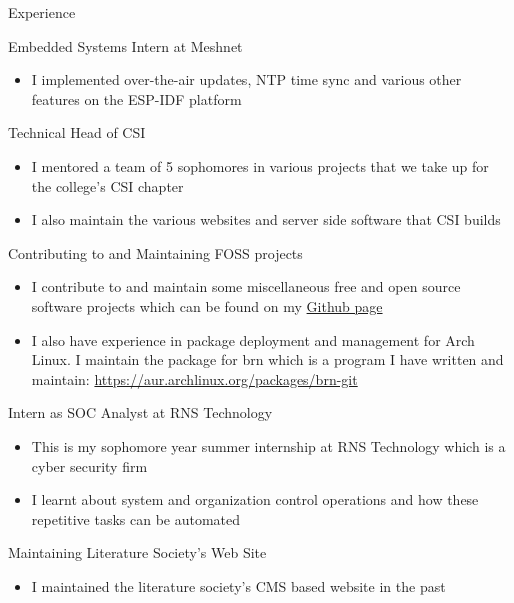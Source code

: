 \documentclass{article}
\newlength{\tabin}
\newlength{\secsep}
\newcommand{\lineunder}{\vspace*{-8pt} \\ \hspace*{-6pt} \hrulefill \\ \vspace*{-15pt}}
\newenvironment{tabbedsection}[1]{
	\begin{list}{}{
		\setlength{\itemsep}{0pt}
		\setlength{\labelsep}{0pt}
		\setlength{\labelwidth}{0pt}
		\setlength{\leftmargin}{\tabin}
		\setlength{\rightmargin}{\tabin}
		\setlength{\listparindent}{0pt}
		\setlength{\parsep}{0pt}
		\setlength{\parskip}{0pt}
		\setlength{\partopsep}{0pt}
		\setlength{\topsep}{#1}
	}
	\item[]
}{\end{list}}
\newenvironment{resume_section}[1]{
	\filbreak
	\vspace{2\secsep}
	\textsc{\large#1}
	\lineunder
	\begin{tabbedsection}{\secsep}
}{\end{tabbedsection}}
\newenvironment{resume_subsection}[2][]{
	\textbf{#2} \hfill {\footnotesize #1} \hspace{2em}
	\begin{tabbedsection}{0.5\secsep}
}{\end{tabbedsection}}
\newenvironment{subitems}{
	\renewcommand{\labelitemi}{-}
	\begin{itemize}
		\setlength{\labelsep}{1em}
}{\end{itemize}}
\begin{document}
\begin{resume_section}{Experience}

	\begin{resume_subsection}{Embedded Systems Intern at Meshnet}
		\begin{subitems}
			\item I implemented over-the-air updates, NTP time sync
				and various other features on the ESP-IDF
				platform
		\end{subitems}
	\end{resume_subsection}

	\begin{resume_subsection}{Technical Head of CSI}
		\begin{subitems}
			\item I mentored a team of 5 sophomores in various
				projects that we take up for the college's CSI
				chapter
			\item I also maintain the various websites and server
				side software that CSI builds
		\end{subitems}
	\end{resume_subsection}

	\begin{resume_subsection}{Contributing to and Maintaining FOSS projects}
		\begin{subitems}
		\item I contribute to and maintain some miscellaneous free
			and open source software projects which can be found on
			my \href{https://github.com/nimaipatel}{Github page}
		\item I also have experience in package deployment and
			management for Arch Linux. I maintain the package for
			brn which is a program I have written and maintain:
			\href{https://aur.archlinux.org/packages/brn-git}{https://aur.archlinux.org/packages/brn-git}
		\end{subitems}
	\end{resume_subsection}

	\begin{resume_subsection}{Intern as SOC Analyst at RNS Technology}
		\begin{subitems}
		\item This is my sophomore year summer internship at RNS Technology
			which is a cyber security firm
		\item I learnt about system and organization control operations and
			how these repetitive tasks can be automated
		\end{subitems}
	\end{resume_subsection}

	\begin{resume_subsection}{Maintaining Literature Society's Web Site}
		\begin{subitems}
			\item I maintained the literature society's
				CMS based website in the past
		\end{subitems}
	\end{resume_subsection}

\end{resume_section}
\end{document}
